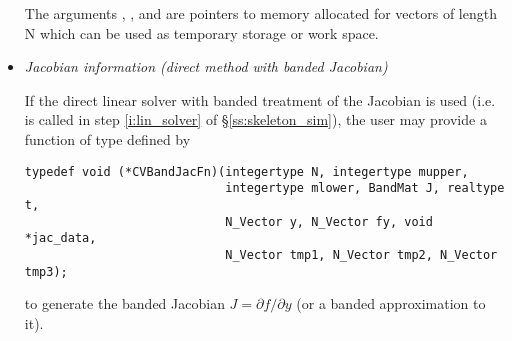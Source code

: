 \begin{itemize}
  The arguments , , and  are pointers to 
  memory allocated for vectors of length N which can be used 
  as temporary storage or work space.
%
%
\item {\em Jacobian information (direct method with banded Jacobian)}
  \label{p:bjac}
  
  If the direct linear solver with banded treatment of the Jacobian is used 
  (i.e.  is called in step \ref{i:lin_solver} of \S\ref{ss:skeleton_sim}), 
  the user may provide a function of type  defined by
\begin{verbatim}
typedef void (*CVBandJacFn)(integertype N, integertype mupper, 
                            integertype mlower, BandMat J, realtype t, 
                            N_Vector y, N_Vector fy, void *jac_data,
                            N_Vector tmp1, N_Vector tmp2, N_Vector tmp3);
\end{verbatim}
  to generate the banded Jacobian $J = \partial f / \partial y$ 
  (or a banded approximation to it).
  

\end{itemize}
